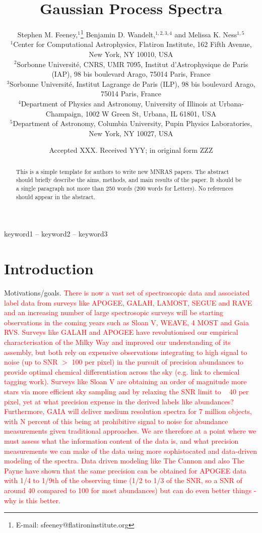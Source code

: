 \documentclass[a4paper,fleqn,usenatbib]{mnras}
\title[Gaussian Process Spectra]{Gaussian Process Spectra}
\author[S. M. Feeney et al.]{
Stephen M. Feeney,$^{1}$\thanks{E-mail: sfeeney@flatironinstitute.org}
Benjamin D. Wandelt,$^{1,2,3,4}$
and Melissa K. Ness$^{1,5}$
\\
$^{1}$Center for Computational Astrophysics, Flatiron Institute, 162 Fifth Avenue, New York, NY 10010, USA\\
$^{2}$Sorbonne Universit\'e, CNRS, UMR 7095,  Institut d'Astrophysique de Paris (IAP), 98 bis boulevard Arago, 75014 Paris, France\\
$^{3}$Sorbonne Universit\'e, Institut Lagrange de Paris (ILP), 98 bis boulevard Arago, 75014 Paris, France\\
$^{4}$Department of Physics and Astronomy, University of Illinois at Urbana-Champaign, 1002 W Green St, Urbana, IL 61801, USA\\
$^{5}$Department of Astronomy, Columbia University, Pupin Physics Laboratories, New York, NY 10027, USA
}
\date{Accepted XXX. Received YYY; in original form ZZZ}
\begin{document}
\label{firstpage}
\pagerange{\pageref{firstpage}--\pageref{lastpage}}
\maketitle

\begin{abstract}
This is a simple template for authors to write new MNRAS papers.
The abstract should briefly describe the aims, methods, and main results of the paper.
It should be a single paragraph not more than 250 words (200 words for Letters).
No references should appear in the abstract.
\end{abstract}

\begin{keywords}
keyword1 -- keyword2 -- keyword3
\end{keywords}


\section{Introduction}

Motivations/goals. 
\textcolor{red}{There is now a vast set of spectroscopic data and associated label data from surveys like APOGEE, GALAH, LAMOST, SEGUE and RAVE and an increasing number of large spectrosopic surveys will be starting observations in the coming years such as Sloan V, WEAVE, 4 MOST and Gaia RVS. Surveys like GALAH and APOGEE have revolutionised our empirical characterisation of the Milky Way and improved our understanding of its assembly, but both rely on expensive observations integrating to high signal to noise (up to SNR $>$ 100 per pixel) in the pursuit of precision abundances to provide optimal chemical differentiation across the sky (e.g. link to chemical tagging work). Surveys like Sloan V are obtaining an order of magnitude more stars via more efficient sky sampling and by relaxing the SNR limit to ~ 40 per pixel, yet at what precision expense in the derived labels like abundances? Furthermore, GAIA will deliver medium resolution spectra for 7 million objects, with N percent of this being at prohibitive signal to noise for abundance measurements given traditional approaches. We are therefore at a point where we must assess what the information content of the data is, and what precision measurements we can make of the data using more sophistocated and data-driven modeling of the spectra.  Data driven modeling like The Cannon and also The Payne have shown that the same precision can be obtained for APOGEE data with 1/4 to 1/9th of the observing time (1/2 to 1/3 of the SNR, so a SNR of around 40 compared to 100 for most abundances) but can do even better things - why is this better.  }
\end{document}
